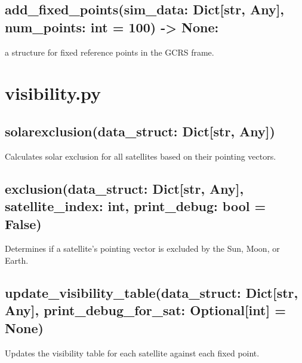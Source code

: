 \documentclass{article}
\begin{document}
\subsection*{add\_fixed\_points(sim\_data: Dict[str, Any], num\_points: int = 100) -> None:}\nAdds a structure for fixed reference points in the GCRS frame.

\section*{visibility.py}
\subsection*{solarexclusion(data\_struct: Dict[str, Any])}
Calculates solar exclusion for all satellites based on their pointing vectors.
\subsection*{exclusion(data\_struct: Dict[str, Any], satellite\_index: int, print\_debug: bool = False)}
Determines if a satellite's pointing vector is excluded by the Sun, Moon, or Earth.
\subsection*{update\_visibility\_table(data\_struct: Dict[str, Any], print\_debug\_for\_sat: Optional[int] = None)}
Updates the visibility table for each satellite against each fixed point.
\end{document}
